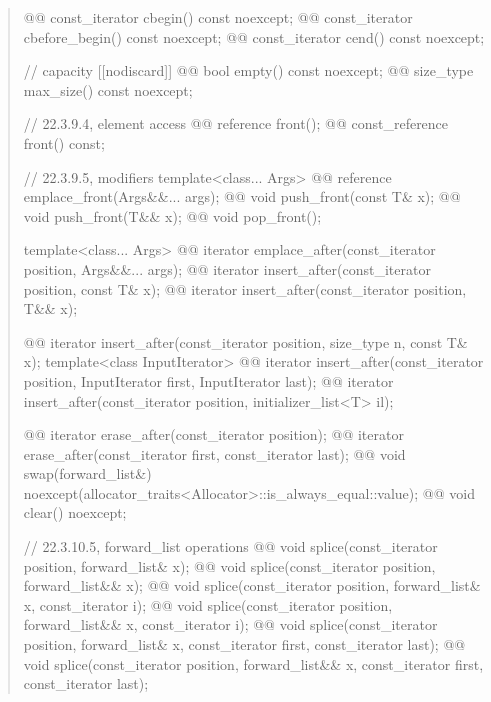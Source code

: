 \documentclass{wg21}
\begin{document}
\begin{quote}
\begin{codeblock}
{{    @@ const_iterator         cbegin() const noexcept;
    @@ const_iterator         cbefore_begin() const noexcept;
    @@ const_iterator         cend() const noexcept;

    // capacity
    [[nodiscard]] @@ bool empty() const noexcept;
    @@ size_type max_size() const noexcept;

    // 22.3.9.4, element access
    @@ reference       front();
    @@ const_reference front() const;

    // 22.3.9.5, modifiers
    template<class... Args> @@ reference emplace_front(Args&&... args);
    @@ void push_front(const T& x);
    @@ void push_front(T&& x);
    @@ void pop_front();

    template<class... Args> @@ iterator emplace_after(const_iterator position, Args&&... args);
    @@ iterator insert_after(const_iterator position, const T& x);
    @@ iterator insert_after(const_iterator position, T&& x);
    
    @@ iterator insert_after(const_iterator position, size_type n, const T& x);
    template<class InputIterator>
    @@ iterator insert_after(const_iterator position, InputIterator first, InputIterator last);
    @@ iterator insert_after(const_iterator position, initializer_list<T> il);
    
    @@ iterator erase_after(const_iterator position);
    @@ iterator erase_after(const_iterator first, const_iterator last);
    @@ void     swap(forward_list&)
      noexcept(allocator_traits<Allocator>::is_always_equal::value);
    @@ void     clear() noexcept;
    
    // 22.3.10.5, forward_list operations
    @@ void splice(const_iterator position, forward_list& x);
    @@ void splice(const_iterator position, forward_list&& x);
    @@ void splice(const_iterator position, forward_list& x, const_iterator i);
    @@ void splice(const_iterator position, forward_list&& x, const_iterator i);
    @@ void splice(const_iterator position, forward_list& x, const_iterator first, const_iterator last);
    @@ void splice(const_iterator position, forward_list&& x, const_iterator first, const_iterator last);
    
}}
\end{codeblock}
\end{quote}
\end{document}
